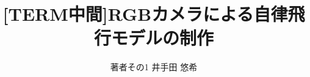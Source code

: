 \documentclass[uplatex,a4j,10pt]{jsarticle}
\begin{document}

\title{[TERM中間]RGBカメラによる自律飛行モデルの制作}

\author{
    著者その1 {井手田 悠希}
}

 

\maketitle
\thispagestyle{empty}







\end{document}
